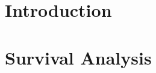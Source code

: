 \documentclass[mestrado, pre-defesa]{packages/icmc}
\begin{document}
\textual

\chapter{Introduction}
\label{chapter:introducao}


\chapter{Survival Analysis}
\label{chapter:survival-analysis}


% 

% 

% 

% 

% 

% 

% 
\end{document}
